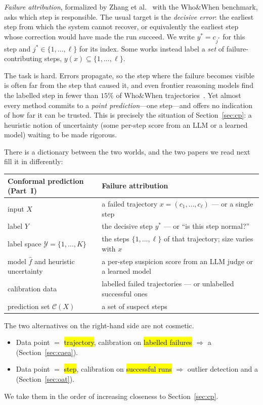 \documentclass[11pt]{article}
\theoremstyle{definition}
\newcommand{\C}{\mathcal{C}}
\newcommand{\Y}{\mathcal{Y}}
\newcommand{\fhat}{\hat{f}}
\newcommand{\ystar}{y^*}
\newcommand{\jstar}{j^*}
\begin{document}
\emph{Failure attribution}, formalized by Zhang et al.~\cite{whowhen} with the Who\&When benchmark, asks which step is responsible. The usual target is the \emph{decisive error}: the earliest step from which the system cannot recover, or equivalently the earliest step whose correction would have made the run succeed. We write $\ystar=c_{\jstar}$ for this step and $\jstar\in\{1,\dots,\ell\}$ for its index. Some works instead label a \emph{set} of failure-contributing steps, $y(x)\subseteq\{1,\dots,\ell\}$.

The task is hard. Errors propagate, so the step where the failure becomes visible is often far from the step that caused it, and even frontier reasoning models find the labelled step in fewer than $15\%$ of Who\&When trajectories~\cite{whowhen,oat}. Yet almost every method commits to a \emph{point prediction}---one step---and offers no indication of how far it can be trusted. This is precisely the situation of Section~\ref{sec:cp}: a heuristic notion of uncertainty (some per-step score from an LLM or a learned model) waiting to be made rigorous.

There is a dictionary between the two worlds, and the two papers we read next fill it in differently:
\begin{center}\small
\begin{tabular}{@{}ll@{}}\toprule
Conformal prediction (Part~I) & Failure attribution\\\midrule
input $X$ & a failed trajectory $x=(c_1,\dots,c_\ell)$ --- or a single step\\
label $Y$ & the decisive step $\ystar$ --- or ``is this step normal?''\\
label space $\Y=\{1,\dots,K\}$ & the steps $\{1,\dots,\ell\}$ of that trajectory; size varies with $x$\\
model $\fhat$ and heuristic uncertainty & a per-step suspicion score from an LLM judge or a learned model\\
calibration data & labelled failed trajectories --- or unlabelled successful ones\\
prediction set $\C(X)$ & a set of suspect steps\\\bottomrule
\end{tabular}
\end{center}
The two alternatives on the right-hand side are not cosmetic.
\begin{keybox}
\begin{itemize}[leftmargin=1.5em]
\item Data point $=$ \hl{trajectory}, calibration on \hl{labelled failures} $\Rightarrow$ a  (Section~\ref{sec:caea}).
\item Data point $=$ \hl{step}, calibration on \hl{successful runs} $\Rightarrow$ outlier detection and a  (Section~\ref{sec:oat}).
\end{itemize}
\end{keybox}
\noindent We take them in the order of increasing closeness to Section~\ref{sec:cp}.
\end{document}
